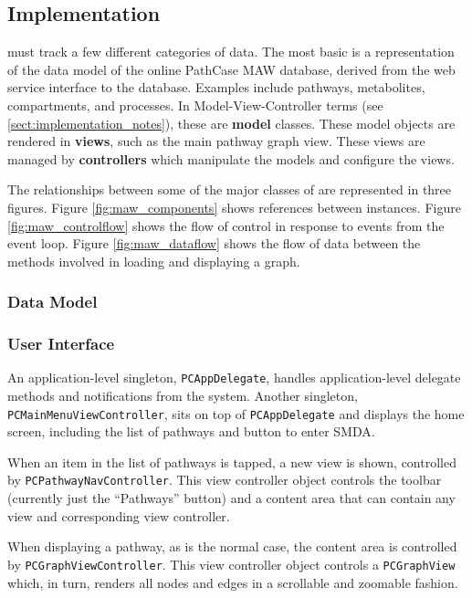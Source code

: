 \subsection{Implementation}
\label{sect:maw_implementation}

\mawapp must track a few different categories of data. The most
basic is a representation of the data model of the online PathCase MAW database,
derived from the web service interface to the database. Examples include
pathways, metabolites, compartments, and processes. In Model-View-Controller
terms (see \ref{sect:implementation_notes}), these are \textbf{model} classes.
These model objects are rendered in \textbf{views}, such as the main pathway
graph view.  These views are managed by \textbf{controllers} which manipulate
the models and configure the views.

The relationships between some of the major classes of \mawapp are represented
in three figures. Figure \ref{fig:maw_components} shows references between
instances. Figure \ref{fig:maw_controlflow} shows the flow of control in
response to events from the event loop. Figure \ref{fig:maw_dataflow} shows the
flow of data between the methods involved in loading and displaying a graph.

\subsubsection{Data Model}
\label{sect:maw_data_model}

\subsubsection{User Interface}
\label{sect:maw_ui}

An application-level singleton, \texttt{PCAppDelegate}, handles
application-level delegate methods and notifications from the system. Another
singleton, \texttt{PCMainMenuViewController}, sits on top of
\texttt{PCAppDelegate} and displays the home screen, including the list of
pathways and button to enter SMDA.

When an item in the list of pathways is tapped, a new view is shown, controlled
by \texttt{PCPathwayNavController}. This view controller object controls the
toolbar (currently just the ``Pathways'' button) and a content area that can
contain any view and corresponding view controller.

When displaying a pathway, as is the normal case, the content area is controlled
by \texttt{PCGraphViewController}. This view controller object controls a
\texttt{PCGraphView} which, in turn, renders all nodes and edges in a scrollable
and zoomable fashion.

